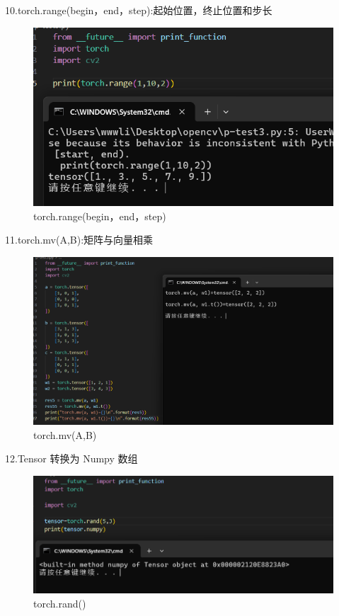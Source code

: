 \documentclass[a4paper, 12pt]{article}
\begin{document}
10.torch.range(begin，end，step):起始位置，终止位置和步长 
\begin{figure}[H]
  \centering
  \includegraphics[width=\textwidth]{屏幕截图 2024-09-15 105412.png}
  \caption{torch.range(begin，end，step)}
\end{figure}

11.torch.mv(A,B):矩阵与向量相乘 
\begin{figure}[H]
  \centering
  \includegraphics[width=\textwidth]{屏幕截图 2024-09-15 105721.png}
  \caption{torch.mv(A,B)}
\end{figure}

12.Tensor 转换为 Numpy 数组
\begin{figure}[H]
  \centering
  \includegraphics[width=\textwidth]{屏幕截图 2024-09-15 105945.png}
  \caption{torch.rand()}
\end{figure}
\end{document}
